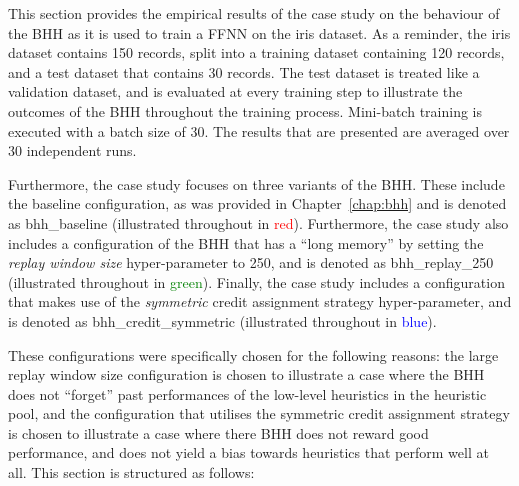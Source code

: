 This section provides the empirical results of the case study on the behaviour of the \acs{BHH} as it is used to train a \acs{FFNN} on the iris dataset. As a reminder, the iris dataset contains 150 records, split into a training dataset containing 120 records, and a test dataset that contains 30 records. The test dataset is treated like a validation dataset, and is evaluated at every training step to illustrate the outcomes of the \acs{BHH} throughout the training process. Mini-batch training is executed with a batch size of 30. The results that are presented are averaged over 30 independent runs.

Furthermore, the case study focuses on three variants of the \acs{BHH}. These include the baseline configuration, as was provided in Chapter~\ref{chap:bhh} and is denoted as bhh\_baseline (illustrated throughout in \textcolor{red}{red}). Furthermore, the case study also includes a configuration of the \acs{BHH} that has a ``long memory'' by setting the \textit{replay window size} hyper-parameter to 250, and is denoted as bhh\_replay\_250 (illustrated throughout in \textcolor{green}{green}). Finally, the case study includes a configuration that makes use of the \textit{symmetric} credit assignment strategy hyper-parameter, and is denoted as bhh\_credit\_symmetric (illustrated throughout in \textcolor{blue}{blue}).

These configurations were specifically chosen for the following reasons: the large replay window size configuration is chosen to illustrate a case where the \acs{BHH} does not ``forget'' past performances of the low-level heuristics in the heuristic pool, and the configuration that utilises the symmetric credit assignment strategy is chosen to illustrate a case where there \acs{BHH} does not reward good performance, and does not yield a bias towards heuristics that perform well at all. This section is structured as follows:

